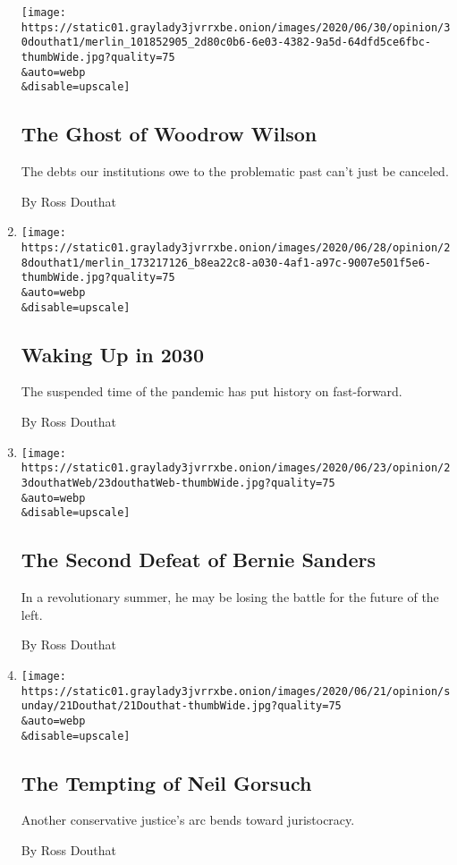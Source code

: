 \begin{enumerate}
  \texttt{[image: https://static01.graylady3jvrrxbe.onion/images/2020/06/30/opinion/30douthat1/merlin\_101852905\_2d80c0b6-6e03-4382-9a5d-64dfd5ce6fbc-thumbWide.jpg?quality=75\\\&auto=webp\\\&disable=upscale]}

  \hypertarget{the-ghost-of-woodrow-wilson}{%
  \subsection{The Ghost of Woodrow
  Wilson}\label{the-ghost-of-woodrow-wilson}}

  The debts our institutions owe to the problematic past can't just be
  canceled.

  By Ross Douthat
\item
  \href{/2020/06/27/opinion/sunday/us-coronavirus-2030.html}{}

  \texttt{[image: https://static01.graylady3jvrrxbe.onion/images/2020/06/28/opinion/28douthat1/merlin\_173217126\_b8ea22c8-a030-4af1-a97c-9007e501f5e6-thumbWide.jpg?quality=75\\\&auto=webp\\\&disable=upscale]}

  \hypertarget{waking-up-in-2030}{%
  \subsection{Waking Up in 2030}\label{waking-up-in-2030}}

  The suspended time of the pandemic has put history on fast-forward.

  By Ross Douthat
\item
  \href{/2020/06/23/opinion/bernie-sanders-protesters-democrats.html}{}

  \texttt{[image: https://static01.graylady3jvrrxbe.onion/images/2020/06/23/opinion/23douthatWeb/23douthatWeb-thumbWide.jpg?quality=75\\\&auto=webp\\\&disable=upscale]}

  \hypertarget{the-second-defeat-of-bernie-sanders}{%
  \subsection{The Second Defeat of Bernie
  Sanders}\label{the-second-defeat-of-bernie-sanders}}

  In a revolutionary summer, he may be losing the battle for the future
  of the left.

  By Ross Douthat
\item
  \href{/2020/06/20/opinion/sunday/neil-gorsuch-supreme-court.html}{}

  \texttt{[image: https://static01.graylady3jvrrxbe.onion/images/2020/06/21/opinion/sunday/21Douthat/21Douthat-thumbWide.jpg?quality=75\\\&auto=webp\\\&disable=upscale]}

  \hypertarget{the-tempting-of-neil-gorsuch}{%
  \subsection{The Tempting of Neil
  Gorsuch}\label{the-tempting-of-neil-gorsuch}}

  Another conservative justice's arc bends toward juristocracy.

  By Ross Douthat
\end{enumerate}


